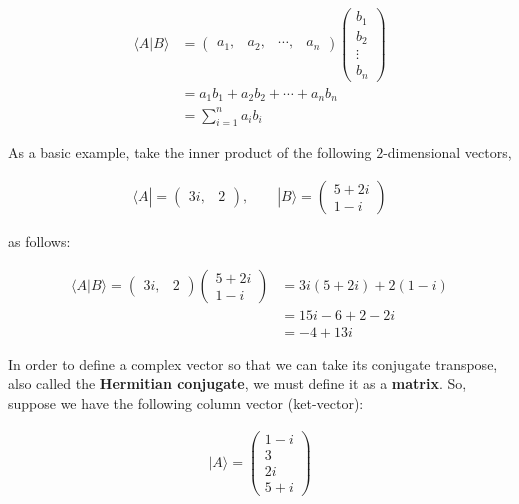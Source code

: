 \documentclass[11pt]{article}
\begin{document}
\begin{align} \langle A| B \rangle &= \begin{pmatrix} 
a_1, & a_2, & \cdots, & a_n
\end{pmatrix}
\begin{pmatrix}
b_1 \\ b_2 \\ \vdots \\ b_n
\end{pmatrix}\\
&= 
a_1b_1 + a_2b_2 + \cdots + a_nb_n\\
&= \sum_{i=1}^n a_ib_i
\end{align}

    As a basic example, take the inner product of the following
\(2\)-dimensional vectors,

\begin{align} \langle A| = \begin{pmatrix}
3i, & 2
\end{pmatrix}, \quad \quad |B\rangle = \begin{pmatrix}
5+2i \\ 1-i
\end{pmatrix} \end{align}

as follows:

\begin{align}
\langle A| B \rangle = \begin{pmatrix}
3i, & 2
\end{pmatrix}
\begin{pmatrix}
5+2i \\ 1-i
\end{pmatrix} &= 
3i(5+2i) + 2(1-i)\\ 
&= 15i-6+2-2i\\ 
&= -4+13i
\end{align}

    In order to define a complex vector so that we can take its conjugate
transpose, also called the \textbf{Hermitian conjugate}, we must define
it as a \textbf{matrix}. So, suppose we have the following column vector
(ket-vector):

\begin{align}
|A\rangle = \begin{pmatrix} 1-i \\ 3 \\ 2i \\ 5+i \end{pmatrix}
\end{align}
\end{document}
